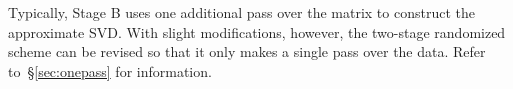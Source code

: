 \documentclass{article}
\begin{document}

Typically, Stage B uses one additional pass over the matrix to
construct the approximate SVD.
With slight modifications, however, the two-stage randomized scheme
can be revised so that it only makes a single pass over the
data.  Refer to~\S\ref{sec:onepass} for information.


\end{document}
